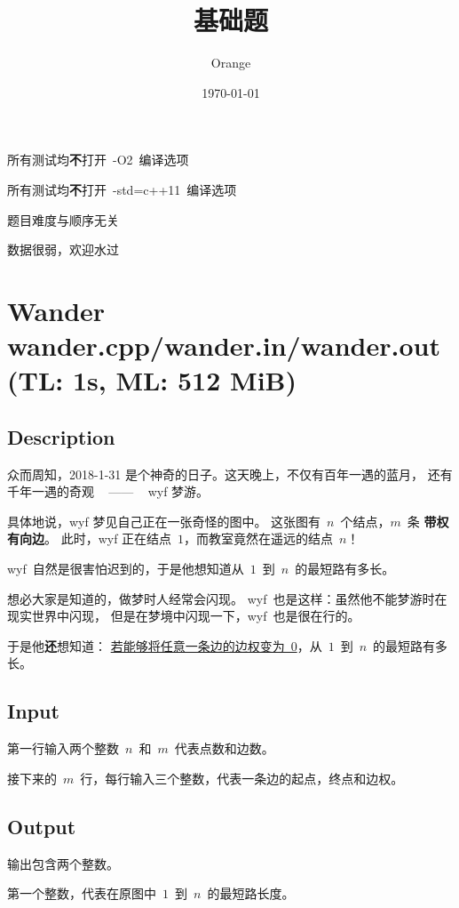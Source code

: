 \documentclass[12pt, hyperref, UTF8]{article}
\title{基础题}
\author{Orange}
\date{\today}
\begin{document}
	\heiti

	\maketitle
	\bigskip
	\begin{center}
		\Large{所有测试均\textbf{不}打开~-O2~编译选项}

		\Large{所有测试均\textbf{不}打开~-std=c++11~编译选项}

		\vspace{15mm}
		\Large{题目难度与顺序无关}
		
		\Large{数据很弱，欢迎水过}
	\end{center}
	
	\newpage
	\section{Wander \small{wander.cpp/wander.in/wander.out
	(TL: 1s, ML: 512 MiB)}}

	\subsection{Description}
	众而周知，2018-1-31 是个神奇的日子。这天晚上，不仅有百年一遇的蓝月，
	还有千年一遇的奇观 ~ —— ~ wyf 梦游。
	
	具体地说，wyf 梦见自己正在一张奇怪的图中。
	这张图有~$n$~个结点，$m$~条 \textbf{带权有向边}。
	此时，wyf 正在结点~$1$，而教室竟然在遥远的结点~$n$！
	
	wyf~自然是很害怕迟到的，于是他想知道从~$1$~到~$n$~的最短路有多长。

	想必大家是知道的，做梦时人经常会闪现。
	wyf~也是这样：虽然他不能梦游时在现实世界中闪现，
	但是在梦境中闪现一下，wyf~也是很在行的。

	于是他\textbf{还}想知道：
	\underline{若能够将任意一条边的边权变为~0}，从~$1$~到~$n$~的最短路有多长。

	\subsection{Input}
	第一行输入两个整数~$n$~和~$m$~代表点数和边数。

	接下来的~$m$~行，每行输入三个整数，代表一条边的起点，终点和边权。

	\subsection{Output}
	输出包含两个整数。

	第一个整数，代表在原图中~$1$~到~$n$~的最短路长度。
\end{document}
